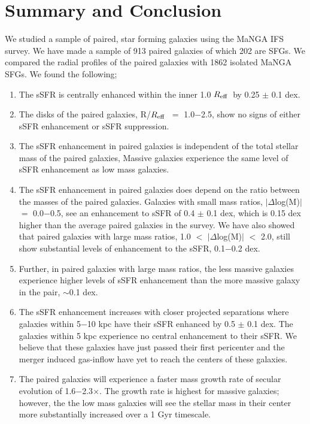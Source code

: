 \documentclass[iop,revtex4,twocolumn,apj,numberedappendix,appendixfloats]{emulateapj}
\newcommand{\reff}{$R_{\rm eff}$}
\begin{document}
\section{Summary and Conclusion}\label{sec:sum}

We studied a sample of paired, star forming galaxies using the MaNGA IFS survey. We have made a sample of 913 paired galaxies of which 202 are SFGs. We compared the radial profiles of the paired galaxies with 1862 isolated MaNGA SFGs. We found the following;

\begin{enumerate}
\item The sSFR is centrally enhanced within the inner 1.0 \reff\ by 0.25 $\pm$ 0.1 dex. 
\item The disks of the paired galaxies, R/\reff\ $=$ 1.0$-$2.5, show no signs of either sSFR enhancement or sSFR suppression. 
\item The sSFR enhancement in paired galaxies is independent of the total stellar mass of the paired galaxies, Massive galaxies experience the same level of sSFR enhancement as low mass galaxies.
\item The sSFR enhancement in paired galaxies does depend on the ratio between the masses of the paired galaxies. Galaxies with small mass ratios, $|\Delta$log(M)$|$ $=$ 0.0$-$0.5, see an enhancement to sSFR of 0.4 $\pm$ 0.1 dex, which is 0.15 dex higher than the average paired galaxies in the survey. We have also showed that paired galaxies with large mass ratios, 1.0 $<$ $|\Delta$log(M)$|$ $<$ 2.0, still show substantial levels of enhancement to the sSFR, 0.1$-$0.2 dex. 
\item Further, in paired galaxies with large mass ratios, the less massive galaxies experience higher levels of sSFR enhancement than the more massive galaxy in the pair, $\sim$0.1 dex.
\item The sSFR enhancement increases with closer projected separations where galaxies within 5$-$10 kpc have their sSFR enhanced by 0.5 $\pm$ 0.1 dex. The galaxies within 5 kpc experience no central enhancement to their sSFR. We believe that these galaxies have just passed their first pericenter and the merger induced gas-inflow have yet to reach the centers of these galaxies.
\item The paired galaxies will experience a faster mass growth rate of secular evolution of 1.6$-$2.3$\times$. The growth rate is highest for massive galaxies; however, the the low mass galaxies will see the stellar mass in their center more substantially increased over a 1 Gyr timescale. 

\end{enumerate}
\end{document}
